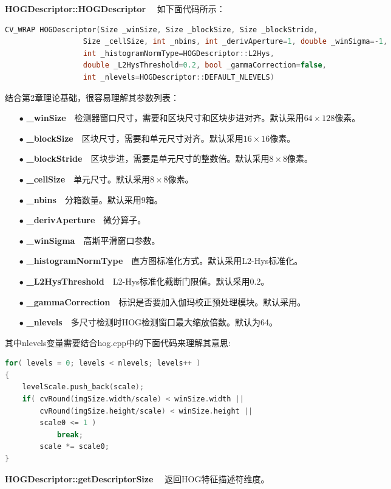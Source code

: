 \textbf{HOGDescriptor::HOGDescriptor}~~
如下面代码所示：
\begin{lstlisting}[language=C++]
    CV_WRAP HOGDescriptor(Size _winSize, Size _blockSize, Size _blockStride,
                  Size _cellSize, int _nbins, int _derivAperture=1, double _winSigma=-1,
                  int _histogramNormType=HOGDescriptor::L2Hys,
                  double _L2HysThreshold=0.2, bool _gammaCorrection=false,
                  int _nlevels=HOGDescriptor::DEFAULT_NLEVELS)
\end{lstlisting}
结合第2章理论基础，很容易理解其参数列表：
\begin{enumerate}
\item[$\bullet$]\textbf{\_winSize}~~检测器窗口尺寸，需要和区块尺寸和区块步进对齐。默认采用$64\times128$像素。
\item[$\bullet$]\textbf{\_blockSize}~~区块尺寸，需要和单元尺寸对齐。默认采用$16\times16$像素。
\item[$\bullet$]\textbf{\_blockStride}~~区块步进，需要是单元尺寸的整数倍。默认采用$8\times8$像素。
\item[$\bullet$]\textbf{\_cellSize}~~单元尺寸。默认采用$8\times8$像素。
\item[$\bullet$]\textbf{\_nbins}~~分箱数量。默认采用9箱。
\item[$\bullet$]\textbf{\_derivAperture}~~微分算子。
\item[$\bullet$]\textbf{\_winSigma}~~高斯平滑窗口参数。
\item[$\bullet$]\textbf{\_histogramNormType}~~直方图标准化方式。默认采用L2-Hys标准化\cite{DT2005}。
\item[$\bullet$]\textbf{\_L2HysThreshold}~~L2-Hys标准化截断门限值。默认采用0.2。
\item[$\bullet$]\textbf{\_gammaCorrection}~~标识是否要加入伽玛校正预处理模块。默认采用。
\item[$\bullet$]\textbf{\_nlevels}~~多尺寸检测时HOG检测窗口最大缩放倍数。默认为64。
\end{enumerate}
其中\textsf{nlevels}变量需要结合\textsf{hog.cpp}中的下面代码来理解其意思:
\begin{lstlisting}[language=C++]
for( levels = 0; levels < nlevels; levels++ )
{
	levelScale.push_back(scale);
    if( cvRound(imgSize.width/scale) < winSize.width ||
        cvRound(imgSize.height/scale) < winSize.height ||
        scale0 <= 1 )
            break;
        scale *= scale0;
}
\end{lstlisting}

\textbf{HOGDescriptor::getDescriptorSize}~~
返回HOG特征描述符维度。

